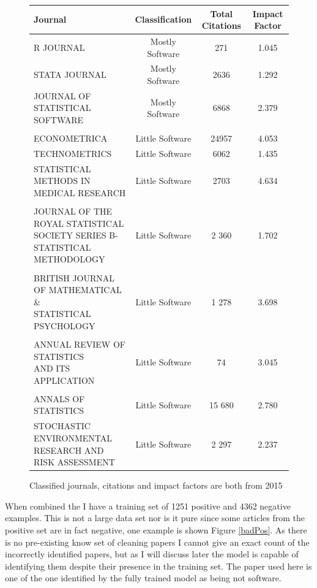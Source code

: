 \documentclass[12pt, a4paper]{article}
\begin{document}
\begin{figure} [H]
	\centering
	\begin{adjustbox}{center}
		\begin{tabular}{lccc}
			\toprule
			Journal & Classification & Total Citations & Impact Factor\\
			\midrule
			R JOURNAL & Mostly Software & 271 & 1.045\\
			STATA JOURNAL&Mostly Software&2636&1.292\\
			\pbox{20cm}{JOURNAL OF\\STATISTICAL SOFTWARE}&Mostly Software &6868&2.379\\
			&&&\\
			ECONOMETRICA&Little Software&24957&4.053\\
			TECHNOMETRICS&Little Software&6062&1.435\\
			\pbox{20cm}{STATISTICAL METHODS IN\\ MEDICAL RESEARCH}& Little Software &2703&4.634\\
			&&&\\
			\pbox{20cm}{JOURNAL OF THE ROYAL STATISTICAL\\ SOCIETY SERIES B-STATISTICAL METHODOLOGY} &Little Software&2 360 &1.702\\
			&&&\\
			\pbox{20cm}{BRITISH JOURNAL OF MATHEMATICAL \&\\ STATISTICAL PSYCHOLOGY}&Little Software&1 278 &3.698\\
			&&&\\
			\pbox{20cm}{ANNUAL REVIEW OF STATISTICS\\ AND ITS APPLICATION}&Little Software&74 & 3.045\\
			&&&\\
			ANNALS OF STATISTICS&Little Software&15 680 &2.780\\
			\pbox{20cm}{STOCHASTIC ENVIRONMENTAL \\RESEARCH AND RISK ASSESSMENT}&Little Software&2 297 &2.237\\
			\bottomrule
		\end{tabular}
	\end{adjustbox}
	\caption{Classified journals, citations and impact factors are both from 2015 }\label{journals}
\end{figure}

When combined the I have a training set of 1251 positive and 4362 negative examples. This is not a large data set nor is it pure since some articles from the positive set are in fact negative, one example\citep{wickham2014tidy} is shown Figure \ref{badPos}. As there is no pre-existing know set of cleaning papers I cannot give an exact count of the incorrectly identified papers, but as I will discuss later the model is capable of identifying them despite their presence in the training set. The paper used here is one of the one identified by the fully trained model as being not software. 
\end{document}
